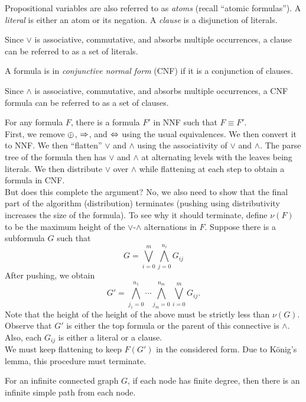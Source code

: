 Propositional variables are also referred to as \textit{atoms} (recall ``atomic formulas''). A \textit{literal} is either an atom or its negation. A \textit{clause} is a disjunction of literals.

Since $\lor$ is associative, commutative, and absorbs multiple occurrences, a clause can be referred to as a set of literals.

\begin{definition}
	A formula is in \textit{conjunctive normal form} (CNF) if it is a conjunction of clauses.
\end{definition}

Since $\land$ is associative, commutative, and absorbs multiple occurrences, a CNF formula can be referred to as a set of clauses.

For any formula $F$, there is a formula $F'$ in NNF such that $F\equiv F'$.\\
First, we remove $\oplus$, $\Rightarrow$, and $\Leftrightarrow$ using the usual equivalences. We then convert it to NNF. We then ``flatten'' $\lor$ and $\land$ using the associativity of $\lor$ and $\land$. The parse tree of the formula then has $\lor$ and $\land$ at alternating levels with the leaves being literals. We then distribute $\lor$ over $\land$ while flattening at each step to obtain a formula in CNF.\\
But does this complete the argument? No, we also need to show that the final part of the algorithm (distribution) terminates (pushing using distributivity increases the size of the formula). To see why it should terminate, define $\nu(F)$ to be the maximum height of the $\lor$-$\land$ alternations in $F$. Suppose there is a subformula $G$ such that
\[ G = \bigvee_{i=0}^{m} \bigwedge_{j=0}^{n_i} G_{ij} \]
After pushing, we obtain
\[ G' = \bigwedge_{j_1=0}^{n_1} \cdots \bigwedge_{j_m=0}^{n_m} \bigvee_{i=0}^m G_{ij}. \]
Note that the height of the height of the above must be strictly less than $\nu(G)$.\\
Observe that $G'$ is either the top formula or the parent of this connective is $\land$. Also, each $G_{ij}$ is either a literal or a clause.\\
We must keep flattening to keep $F(G')$ in the considered form. Due to K\"{o}nig's lemma, this procedure must terminate.

\begin{lemma}
	For an infinite connected graph $G$, if each node has finite degree, then there is an infinite simple path from each node.
\end{lemma}

